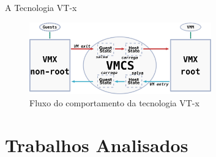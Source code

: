 \documentclass[xcolor={usenames,svgnames,dvipsnames},brazil,english,12pt,aspectratio=149]{beamer}
\begin{document}
\begin{frame}{A Tecnologia VT-x}
  \begin{figure}[!h]
    \centering
    \includegraphics[width=0.7\textwidth]{vt-x_flow} 
    \caption*{Fluxo do comportamento da tecnologia VT-x}
  \end{figure}
\end{frame}

%
%
%
%
%


\section{Trabalhos Analisados}
\end{document}

